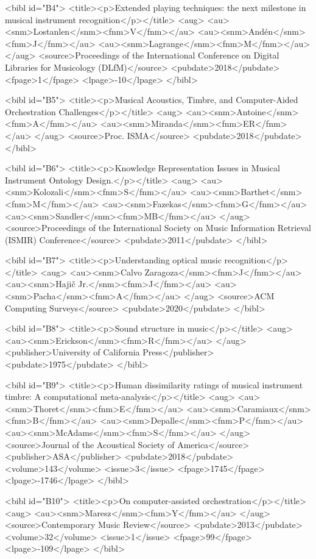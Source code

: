 \documentclass{bmcart}
\begin{document}
\begin{backmatter}
{<bibl id="B4">
  <title><p>Extended playing techniques: the next milestone in musical
  instrument recognition</p></title>
  <aug>
    <au><snm>Lostanlen</snm><fnm>V</fnm></au>
    <au><snm>And{\'e}n</snm><fnm>J</fnm></au>
    <au><snm>Lagrange</snm><fnm>M</fnm></au>
  </aug>
  <source>Proceedings of the International Conference on Digital Libraries for
  Musicology (DLfM)</source>
  <pubdate>2018</pubdate>
  <fpage>1</fpage>
  <lpage>-10</lpage>
</bibl>

<bibl id="B5">
  <title><p>Musical Acoustics, Timbre, and Computer-Aided Orchestration
  Challenges</p></title>
  <aug>
    <au><snm>Antoine</snm><fnm>A</fnm></au>
    <au><snm>Miranda</snm><fnm>ER</fnm></au>
  </aug>
  <source>Proc. ISMA</source>
  <pubdate>2018</pubdate>
</bibl>

<bibl id="B6">
  <title><p>Knowledge Representation Issues in Musical Instrument Ontology
  Design.</p></title>
  <aug>
    <au><snm>Kolozali</snm><fnm>S</fnm></au>
    <au><snm>Barthet</snm><fnm>M</fnm></au>
    <au><snm>Fazekas</snm><fnm>G</fnm></au>
    <au><snm>Sandler</snm><fnm>MB</fnm></au>
  </aug>
  <source>Proceedings of the International Society on Music Information
  Retrieval (ISMIR) Conference</source>
  <pubdate>2011</pubdate>
</bibl>

<bibl id="B7">
  <title><p>Understanding optical music recognition</p></title>
  <aug>
    <au><snm>Calvo Zaragoza</snm><fnm>J</fnm></au>
    <au><snm>Haji\v{c} Jr.</snm><fnm>J</fnm></au>
    <au><snm>Pacha</snm><fnm>A</fnm></au>
  </aug>
  <source>ACM Computing Surveys</source>
  <pubdate>2020</pubdate>
</bibl>

<bibl id="B8">
  <title><p>Sound structure in music</p></title>
  <aug>
    <au><snm>Erickson</snm><fnm>R</fnm></au>
  </aug>
  <publisher>University of California Press</publisher>
  <pubdate>1975</pubdate>
</bibl>

<bibl id="B9">
  <title><p>Human dissimilarity ratings of musical instrument timbre: A
  computational meta-analysis</p></title>
  <aug>
    <au><snm>Thoret</snm><fnm>E</fnm></au>
    <au><snm>Caramiaux</snm><fnm>B</fnm></au>
    <au><snm>Depalle</snm><fnm>P</fnm></au>
    <au><snm>McAdams</snm><fnm>S</fnm></au>
  </aug>
  <source>Journal of the Acoustical Society of America</source>
  <publisher>ASA</publisher>
  <pubdate>2018</pubdate>
  <volume>143</volume>
  <issue>3</issue>
  <fpage>1745</fpage>
  <lpage>-1746</lpage>
</bibl>

<bibl id="B10">
  <title><p>On computer-assisted orchestration</p></title>
  <aug>
    <au><snm>Maresz</snm><fnm>Y</fnm></au>
  </aug>
  <source>Contemporary Music Review</source>
  <pubdate>2013</pubdate>
  <volume>32</volume>
  <issue>1</issue>
  <fpage>99</fpage>
  <lpage>-109</lpage>
</bibl>

}
\end{backmatter}
\end{document}
